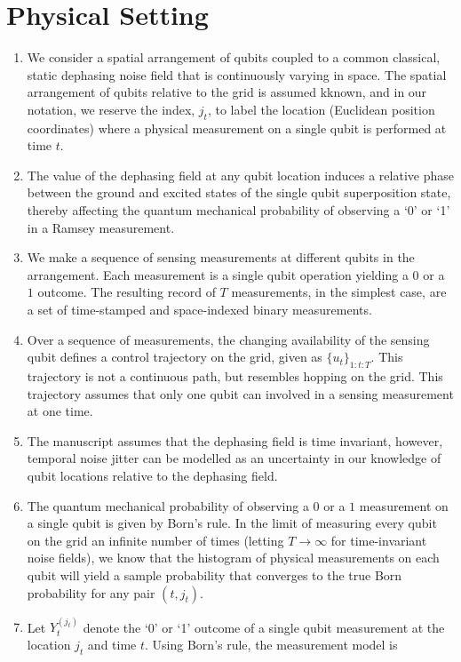 \section{Physical Setting}\label{sec:physicalsetting}

\begin{enumerate}
	\item We consider a spatial arrangement of qubits coupled to a common classical, static dephasing noise field that is continuously varying in space. The spatial arrangement of qubits relative to the grid is assumed kknown, and in our notation, we reserve the index, $j_t$, to label the location (Euclidean position coordinates)  where a physical measurement on a single qubit is performed at time $t$.
	\item The value of the dephasing field at any qubit location induces a relative phase between the ground and excited states of the single qubit superposition state, thereby affecting the  quantum mechanical probability of observing a  `0' or `1' in a Ramsey measurement. 
	\item We make a sequence of sensing measurements  at different qubits in the arrangement. Each measurement is a single qubit operation yielding a $0$ or a $1$ outcome. The resulting record of $T$ measurements, in the simplest case, are a set of time-stamped and space-indexed binary measurements.
	\item Over a sequence of measurements, the changing availability of the sensing qubit defines a control trajectory on the grid, given as $\{u_{t}\}_{1:t:T}$. This trajectory is not a continuous path, but resembles hopping on the grid. This trajectory assumes that only one qubit can involved in a sensing measurement at one time. 
	\item The manuscript assumes that the dephasing field is time invariant, however, temporal noise jitter can be modelled as an uncertainty in our knowledge of qubit locations relative to the dephasing field. 
	\item The quantum mechanical probability of observing a $0$ or a $1$ measurement on a single qubit is given by Born's rule. In the limit of measuring every qubit on the grid an infinite number of times (letting $T \to \infty$ for time-invariant noise fields), we know that the histogram of physical measurements on each qubit will yield a sample probability that converges to the true Born probability for any pair $(t, j_t)$.
	\item Let $Y_t^{(j_t)}$ denote the `0' or `1' outcome of a single qubit measurement at the location $j_t$ and time $t$. Using Born's rule, the measurement model is

\end{enumerate}
